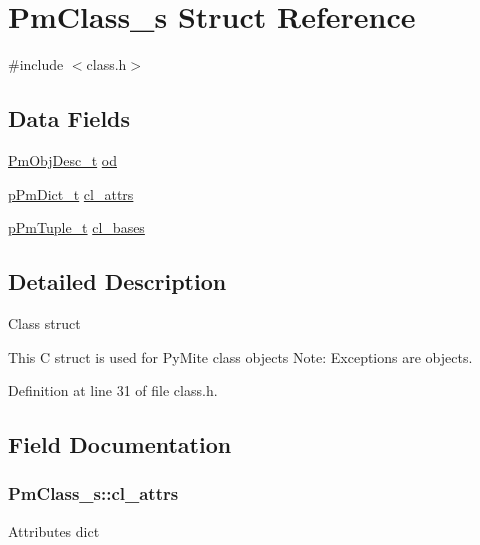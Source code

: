 \hypertarget{struct_pm_class__s}{\section{Pm\-Class\-\_\-s Struct Reference}
\label{struct_pm_class__s}
}


{\ttfamily \#include $<$class.\-h$>$}

\subsection*{Data Fields}
\begin{DoxyCompactItemize}
\item 
\hyperlink{obj_8h_a72d816790acd8eb550fb25268c2b3489}{Pm\-Obj\-Desc\-\_\-t} \hyperlink{struct_pm_class__s_a2c97a1a85dfb00c7cb5acd413e2f0a8d}{od}
\item 
\hyperlink{dict_8h_a32b81dc9e05f3a84863319301daf749b}{p\-Pm\-Dict\-\_\-t} \hyperlink{struct_pm_class__s_a2792a49b1e50beaf2fc464adb35d57fe}{cl\-\_\-attrs}
\item 
\hyperlink{tuple_8h_a02fea741eaf15db9ac9f4f9ca0433ee1}{p\-Pm\-Tuple\-\_\-t} \hyperlink{struct_pm_class__s_abf165d7503bad49071ebf21a68e87ceb}{cl\-\_\-bases}
\end{DoxyCompactItemize}


\subsection{Detailed Description}
Class struct

This C struct is used for Py\-Mite class objects Note\-: Exceptions are objects. 

Definition at line 31 of file class.\-h.



\subsection{Field Documentation}
\hypertarget{struct_pm_class__s_a2792a49b1e50beaf2fc464adb35d57fe}{
\subsubsection[{cl\-\_\-attrs}]{ Pm\-Class\-\_\-s\-::cl\-\_\-attrs}}\label{struct_pm_class__s_a2792a49b1e50beaf2fc464adb35d57fe}
Attributes dict 

